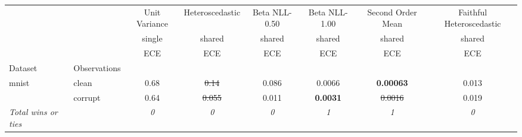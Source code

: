 \begin{tabular}{ll|c|c|c|c|c|c}
\toprule
{} & {} & {Unit Variance} & {Heteroscedastic} & {Beta NLL-0.50} & {Beta NLL-1.00} & {Second Order Mean} & {Faithful Heteroscedastic} \\
{} & {} & {single} & {shared} & {shared} & {shared} & {shared} & {shared} \\
{} & {} & {ECE} & {ECE} & {ECE} & {ECE} & {ECE} & {ECE} \\
{Dataset} & {Observations} & {} & {} & {} & {} & {} & {} \\
\midrule
\multirow[t]{2}{*}{mnist} & clean & 0.68 & \sout{0.14} & 0.086 & 0.0066 & \textbf{0.00063} & 0.013 \\
 & corrupt & 0.64 & \sout{0.055} & 0.011 & \textbf{0.0031} & \sout{0.0016} & 0.019 \\
\textit{{Total wins or ties}} &  & \textit{0} & \textit{0} & \textit{0} & \textit{1} & \textit{1} & \textit{0} \\
\bottomrule
\end{tabular}
